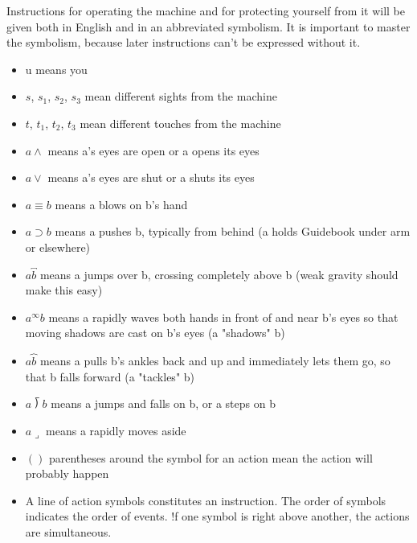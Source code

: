 \documentclass[10pt,twoside]{memoir}
\begin{document}
\begin{enumerate}
{\begin{enumerate}
\begin{sysrules}
\begin{sysrules}
\begin{sysrules}
\begin{sysrules}
{\begin{enumerate}
\begin{sysrules}
Instructions for operating the machine and for protecting yourself from 
it will be given both in English and in an abbreviated symbolism. It is 
important to master the symbolism, because later instructions can't be 
expressed without it. 

\begin{itemize}
\item u means you 

\item $s$, $s_1$, $s_2$, $s_3$ mean different sights from the machine 

\item $t$, $t_1$, $t_2$, $t_3$ mean different touches from the machine 

\item $a\wedge$ means a's eyes are open or a opens its eyes 

\item $a\vee$ means a's eyes are shut or a shuts its eyes 

\item $a\equiv b$ means a blows on b's hand 

\item $a\supset b$ means a pushes b, typically from behind 
(a holds Guidebook under arm or elsewhere) 

\item $a\overbracket{b}$ means a jumps over b, crossing completely above b (weak gravity 
should make this easy) 

\item $a^\infty b$ means a rapidly waves both hands in front of and near b's eyes so that 
moving shadows are cast on b's eyes (a "shadows" b) 

\item $a\overbrace{b}$ means a pulls b's ankles back and up and immediately lets them go, so 
that b falls forward (a "tackles" b) 

\item $a\longdivision{b}$ means a jumps and falls on b, or a steps on b 

\item $a\lrcorner$ means a rapidly moves aside 

\item $()$ parentheses around the symbol for an action mean the action will 
probably happen 

\item A line of action symbols constitutes an instruction. The order of symbols 
indicates the order of events. !f one symbol is right above another, the 
actions are simultaneous. 
\end{itemize}


\end{sysrules}
\end{enumerate}}
\end{sysrules}
\end{sysrules}
\end{sysrules}
\end{sysrules}
\end{enumerate}}
\end{enumerate}
\end{document}
